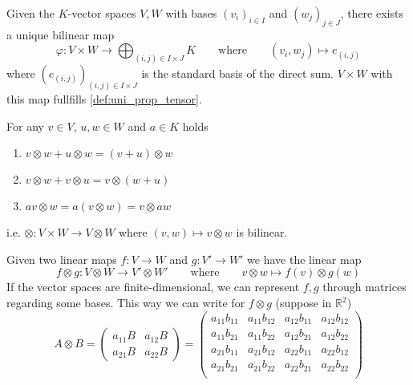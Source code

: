 \begin{proposition}
   Given the \(K\)-vector spaces \(V, W\) with bases \((v_i)_{i \in I}\) and \((w_j)_{j \in J}\), there exists a unique bilinear map
   \[\varphi: V \times W \to \bigoplus_{(i,j) \in I \times J} K \qquad\text{where}\qquad (v_i, w_j) \mapsto e_{(i,j)}\]
   where \((e_{(i,j)})_{(i,j) \in I \times J}\) is the standard basis of the direct sum.
   \(V \times W\) with this map fullfills \cref{def:uni_prop_tensor}.
\end{proposition}

\begin{proposition}
   For any \(v \in V\), \(u, w \in W\) and \(a \in K\) holds
   \begin{enumerate}[label=\roman*, align=Center]
      \item \(v \otimes w + u \otimes w = (v + u) \otimes w\)
      \item \(v \otimes w + v \otimes u = v \otimes (w + u)\)
      \item \(a v \otimes w = a(v \otimes w) = v \otimes aw\)
   \end{enumerate}
   i.e. \(\otimes: V \times W \to V \otimes W\) where \((v, w) \mapsto v \otimes w\) is bilinear.
\end{proposition}

\begin{example}
   Given two linear maps \(f: V \to W\) and \(g: V' \to W'\) we have the linear map
   \[f \otimes g: V \otimes W \to V' \otimes W' \qquad\text{where}\qquad v \otimes w \mapsto f(v) \otimes g(w)\]
   If the vector spaces are finite-dimensional, we can represent \(f, g\) through matrices regarding some bases.
   This way we can write for \(f \otimes g\) (suppose in \(\mathbb{R}^2\))
   \[A \otimes B = \begin{pmatrix}a_{11}B & a_{12} B\\ a_{21} B & a_{22} B\end{pmatrix} = \begin{pmatrix}
      a_{11}b_{11} & a_{11}b_{12} & a_{12}b_{11} & a_{12}b_{12} \\
      a_{11}b_{21} & a_{11}b_{22} & a_{12}b_{21} & a_{12}b_{22} \\
      a_{21}b_{11} & a_{21}b_{12} & a_{22}b_{11} & a_{22}b_{12} \\
      a_{21}b_{21} & a_{21}b_{22} & a_{22}b_{21} & a_{22}b_{22} \\
   \end{pmatrix}\]
\end{example}

